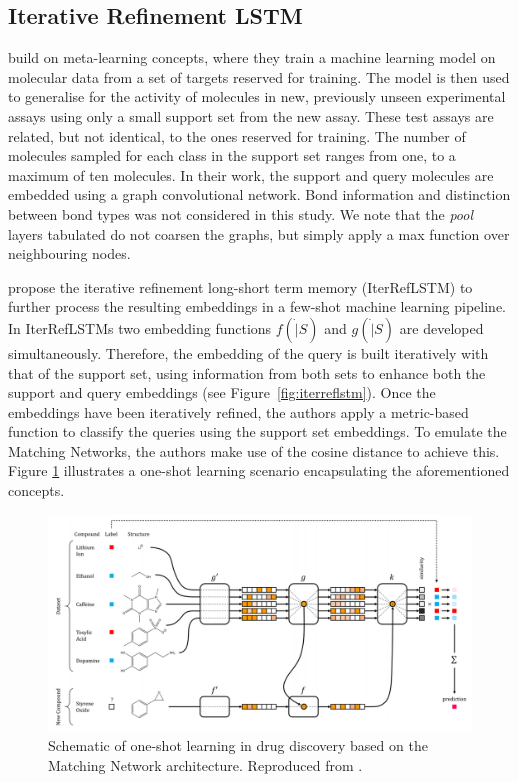 \subsection{Iterative Refinement LSTM}

\citet{altae2017low} build on meta-learning concepts, where they train a machine learning model on molecular data from a set of targets reserved for training. The model is then used to generalise for the activity of molecules in new, previously unseen experimental assays using only a small support set from the new assay. These test assays are related, but not identical, to the ones reserved for training. The number of molecules sampled for each class in the support set ranges from one, to a maximum of ten molecules. In their work, the support and query molecules are embedded using a graph convolutional network.  Bond information and distinction between bond types was not considered in this study. We note that the \textit{pool} layers tabulated do not coarsen the graphs, but simply apply a max function over neighbouring nodes.

\citet{altae2017low} propose the iterative refinement long-short term memory (IterRefLSTM) to further process the resulting embeddings in a few-shot machine learning pipeline. In IterRefLSTMs two embedding functions $f(\dot|S)$ and $g(\dot|S)$ are developed simultaneously. Therefore, the embedding of the query is built iteratively with that of the support set, using information from both sets to enhance both the support and query embeddings (see Figure~\ref{fig:iterreflstm}). Once the embeddings have been iteratively refined, the authors apply a metric-based function to classify the queries using the support set embeddings. To emulate the Matching Networks, the authors make use of the cosine distance to achieve this. Figure \ref{fig:schematiconeshotdrug} illustrates a one-shot learning scenario encapsulating the aforementioned concepts.

\begin{figure}[h]
	\centering
	\includegraphics[width=0.9\linewidth]{img/pandeschematic.png}
	\caption[Schematic of one-shot learning in drug discovery]{Schematic of one-shot learning in drug discovery based on the Matching Network \citep{vinyals2016matching} architecture. Reproduced from \citet{altae2017low}.}
	\label{fig:schematiconeshotdrug}
\end{figure}

